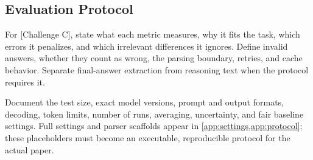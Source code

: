 \subsection{Evaluation Protocol}
For [Challenge C], state what each metric measures, why it fits the task, which errors it penalizes, and which irrelevant differences it ignores. Define invalid answers, whether they count as wrong, the parsing boundary, retries, and cache behavior. Separate final-answer extraction from reasoning text when the protocol requires it.

Document the test size, exact model versions, prompt and output formats, decoding, token limits, number of runs, averaging, uncertainty, and fair baseline settings. Full settings and parser scaffolds appear in \cref{app:settings,app:protocol}; these placeholders must become an executable, reproducible protocol for the actual paper.
